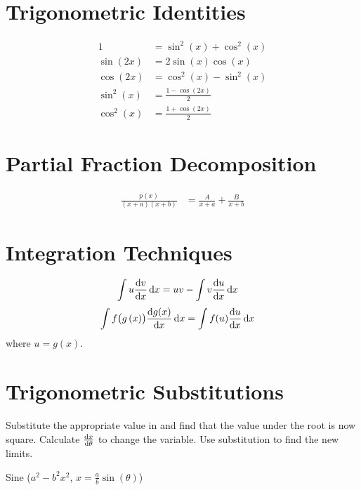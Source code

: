 \documentclass{article}
\begin{document}
\begin{multicols}{3}
    \section*{Trigonometric Identities}
    \begin{align*}
        1                        & = \sin^2{\left( x \right)} + \cos^2{\left( x \right)} \\
        \sin{\left( 2x \right)}  & = 2\sin{\left( x \right)}\cos{\left( x \right)}       \\
        \cos{\left( 2x \right)}  & = \cos^2{\left( x \right)} - \sin^2{\left( x \right)} \\
        \sin^2{\left( x \right)} & = \frac{1-\cos{\left( 2x \right)}}{2}                 \\
        \cos^2{\left( x \right)} & = \frac{1+\cos{\left( 2x \right)}}{2}
    \end{align*}
    \section*{Partial Fraction Decomposition}
    \begin{align*}
        \frac{p(x)}{(x+a)(x+b)} & = \frac{A}{x+a} + \frac{B}{x+b}
    \end{align*}
    \section*{Integration Techniques}
    \begin{align*}
        \int u \dv{v}{x}\dd{x} & = uv - \int v \dv{u}{x}\dd{x}
    \end{align*}
    \begin{align*}
        \int f\bigl(g\left( x \right)\bigr)\dv{g(x)}{x} \dd{x} & = \int f(u) \dv{u}{x}\dd{x}
    \end{align*}
    where \(u = g(x)\).
    \section*{Trigonometric Substitutions}
    Substitute the appropriate value in and find that the value under the root is now square.
    Calculate \(\dv{x}{\theta}\) to change the variable.
    Use substitution to find the new limits.

    Sine (\(a^2-b^2x^2\), \(x=\frac{a}{b}\sin{\left( \theta \right)}\))
    \begin{center}
    \end{center}


\end{multicols}
\end{document}
